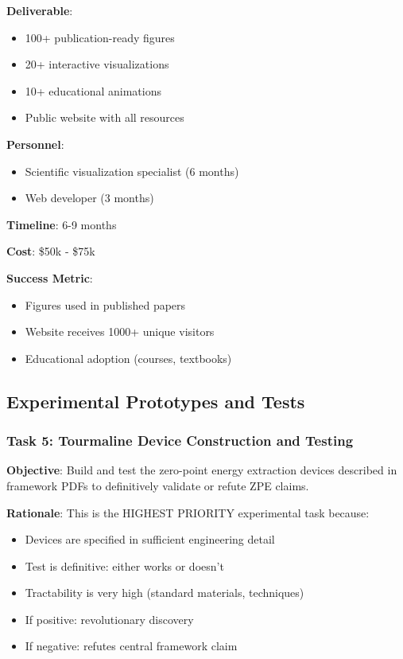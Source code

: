 \textbf{Deliverable}:
\begin{itemize}
    \item 100+ publication-ready figures
    \item 20+ interactive visualizations
    \item 10+ educational animations
    \item Public website with all resources
\end{itemize}

\textbf{Personnel}:
\begin{itemize}
    \item Scientific visualization specialist (6 months)
    \item Web developer (3 months)
\end{itemize}

\textbf{Timeline}: 6-9 months

\textbf{Cost}: \$50k - \$75k

\textbf{Success Metric}:
\begin{itemize}
    \item Figures used in published papers
    \item Website receives 1000+ unique visitors
    \item Educational adoption (courses, textbooks)
\end{itemize}

\subsection{Experimental Prototypes and Tests}

\subsubsection{Task 5: Tourmaline Device Construction and Testing}

\textbf{Objective}: Build and test the zero-point energy extraction devices described in framework PDFs to definitively validate or refute ZPE claims.

\textbf{Rationale}: This is the HIGHEST PRIORITY experimental task because:
\begin{itemize}
    \item Devices are specified in sufficient engineering detail
    \item Test is definitive: either works or doesn't
    \item Tractability is very high (standard materials, techniques)
    \item If positive: revolutionary discovery
    \item If negative: refutes central framework claim
\end{itemize}

